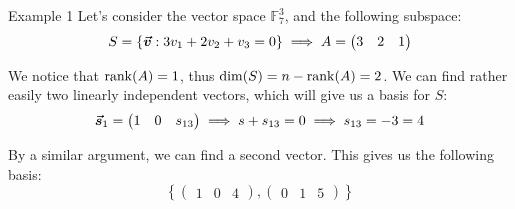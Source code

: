 \documentclass[a4paper]{article}
\begin{document}
\begin{parag}{Example 1}
    Let's consider the vector space $\mathbb{F}_7^3$, and the following subspace: 
    \[S = \left\{\bvec{v} : 3v_1 + 2v_2 + v_3 = 0\right\} \implies A = \begin{pmatrix} 3 & 2 & 1 \end{pmatrix} \]
    
    We notice that $\rank\left(A\right) = 1$, thus $\dim\left(S\right) = n - \rank\left(A\right) = 2$. We can find rather easily two linearly independent vectors, which will give us a basis for $S$: 
    \[\bm{\protect\vec{s}}_1 = \begin{pmatrix} 1 & 0  & s_{13} \end{pmatrix}  \implies s + s_{13} = 0 \implies s_{13} = -3 = 4\]
    
    By a similar argument, we can find a second vector. This gives us the following basis: 
    \[\left\{\begin{pmatrix} 1 & 0 & 4 \end{pmatrix}, \begin{pmatrix} 0 & 1 & 5 \end{pmatrix} \right\}\]
    
\end{parag}
\end{document}
